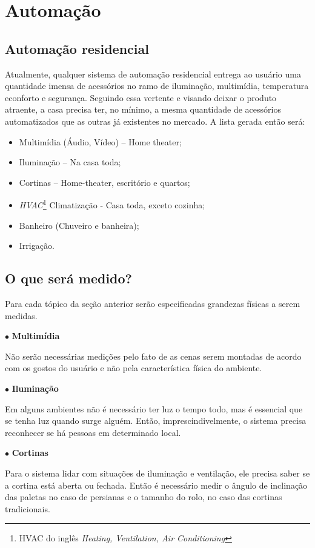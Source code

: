 \section{Automação}
\subsection{Automação residencial}
Atualmente, qualquer sistema de automação residencial entrega ao usuário uma quantidade imensa de acessórios no ramo de iluminação, multimídia, temperatura econforto e segurança. Seguindo essa vertente e visando deixar o produto atraente, a casa precisa ter, no mínimo, a mesma quantidade de acessórios automatizados que as outras já existentes no mercado. A lista gerada então será:

\begin{itemize}
	\item Multimídia (Áudio, Vídeo) – Home theater;
	\item Iluminação – Na casa toda;
	\item Cortinas – Home-theater, escritório e quartos;
	\item \textit{HVAC}\footnote{HVAC do inglês \textit{Heating, Ventilation, Air Conditioning}} Climatização - Casa toda, exceto cozinha;
	\item Banheiro (Chuveiro e banheira);
	\item Irrigação.
\end{itemize}


\subsection{O que será medido?}

	Para cada tópico da seção anterior serão especificadas grandezas físicas a serem medidas.

$\bullet$ \textbf{Multimídia}

	Não serão necessárias medições pelo fato de as cenas serem montadas de acordo com os gostos do usuário e não pela característica física do ambiente.

$\bullet$ \textbf{Iluminação}

	Em alguns ambientes não é necessário ter luz o tempo todo, mas é essencial que se tenha luz quando surge alguém. Então, imprescindivelmente, o sistema precisa reconhecer se há pessoas em determinado local.

$\bullet$ \textbf{Cortinas}

	Para o sistema lidar com situações de iluminação e ventilação, ele precisa saber se a cortina está aberta ou fechada. Então é necessário medir o ângulo de inclinação das paletas no caso de persianas e o tamanho do rolo, no caso das cortinas tradicionais.

